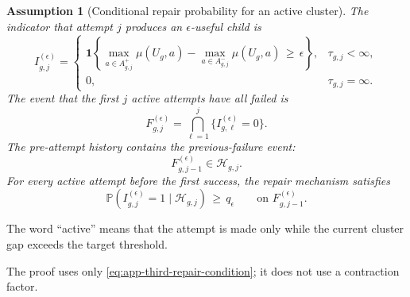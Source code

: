 \documentclass{article} %
\newtheorem{assumption}{Assumption}
\begin{document}
\begin{assumption}[Conditional repair probability for an active cluster]
The indicator that attempt \(j\) produces an \(\epsilon\)-useful child is
\begin{equation}
\label{eq:app-third-success-indicator}
I_{g,j}^{(\epsilon)}
=
\begin{cases}
\mathbf{1}\!\left\{
\max_{a\in A_{g,j}^{+}}\mu(U_g,a)
-
\max_{a\in A_{g,j}^{-}}\mu(U_g,a)
\,\ge\,
\epsilon
\right\},
& \tau_{g,j}<\infty,\\[1mm]
0,
& \tau_{g,j}=\infty.
\end{cases}
\end{equation}
The event that the first \(j\) active attempts have all failed is
\begin{equation}
\label{eq:app-third-failure-event}
F_{g,j}^{(\epsilon)}
=
\bigcap_{\ell=1}^{j}
\{I_{g,\ell}^{(\epsilon)}=0\}.
\end{equation}
The pre-attempt history contains the previous-failure event:
\begin{equation}
\label{eq:app-third-failure-measurable}
F_{g,j-1}^{(\epsilon)}\in\mathcal H_{g,j}.
\end{equation}
For every active attempt before the first success, the repair mechanism satisfies
\begin{equation}
\label{eq:app-third-repair-condition}
\mathbb{P}\!\left(
I_{g,j}^{(\epsilon)}=1
\mid
\mathcal{H}_{g,j}
\right)
\,\ge\,
q_{\epsilon}
\qquad
\text{on }F_{g,j-1}^{(\epsilon)}.
\end{equation}
\end{assumption}

The word ``active'' means that the attempt is made only while the current cluster gap exceeds the target threshold.

The proof uses only \eqref{eq:app-third-repair-condition}; it does not use a contraction factor.
\end{document}
